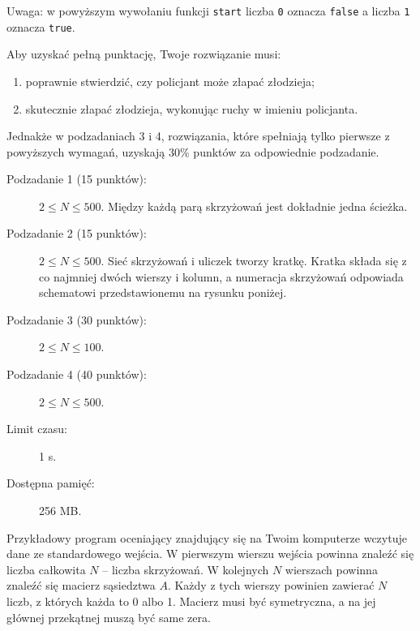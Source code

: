 \documentclass{boi2014-pl}
\renewcommand{\method}[1]{{\tt #1}}
\newcommand{\constant}[1]{{\tt #1}}
\begin{document}
    Uwaga: w powyższym wywołaniu funkcji \method{start} liczba \constant{0} oznacza
    \constant{false} a liczba \constant{1} oznacza \constant{true}.

    \Scoring
    Aby uzyskać pełną punktację, Twoje rozwiązanie musi:
    \begin{enumerate}
      \item poprawnie stwierdzić, czy policjant może złapać złodzieja;
      \item skutecznie złapać złodzieja, wykonując ruchy w imieniu policjanta.
    \end{enumerate}
   
    Jednakże w podzadaniach 3 i 4, rozwiązania, które spełniają tylko pierwsze
    z powyższych wymagań, uzyskają 30\% punktów za odpowiednie podzadanie.

    \begin{description}
        \item[Podzadanie 1 (15 punktów):] $2 \le N \le 500$. Między każdą parą skrzyżowań jest dokładnie jedna ścieżka.
        \item[Podzadanie 2 (15 punktów):] $2 \le N \le 500$. Sieć skrzyżowań i uliczek tworzy kratkę.
        Kratka składa się z co najmniej dwóch wierszy i kolumn, a numeracja skrzyżowań
        odpowiada schematowi przedstawionemu na rysunku poniżej.
        \begin{figure}[h!]
           \centering
        \end{figure}
        \item[Podzadanie 3 (30 punktów):] $2 \le N \le 100$.
        \item[Podzadanie 4 (40 punktów):] $2 \le N \le 500$.
    \end{description}

    \Constraints
    
    \begin{description}
        \item[Limit czasu:] 1 s.
        \item[Dostępna pamięć:] 256 MB.
    \end{description}

    \Experimentation
    Przykładowy program oceniający znajdujący się na Twoim komputerze
    wczytuje dane ze standardowego wejścia.
    W pierwszym wierszu wejścia powinna znaleźć się liczba całkowita $N$ -- liczba skrzyżowań.
    W kolejnych $N$ wierszach powinna znaleźć się macierz sąsiedztwa $A$.
    Każdy z tych wierszy powinien zawierać $N$ liczb, z których każda to 0 albo 1.
    Macierz musi być symetryczna, a na jej głównej przekątnej muszą być same zera.
\end{document}
